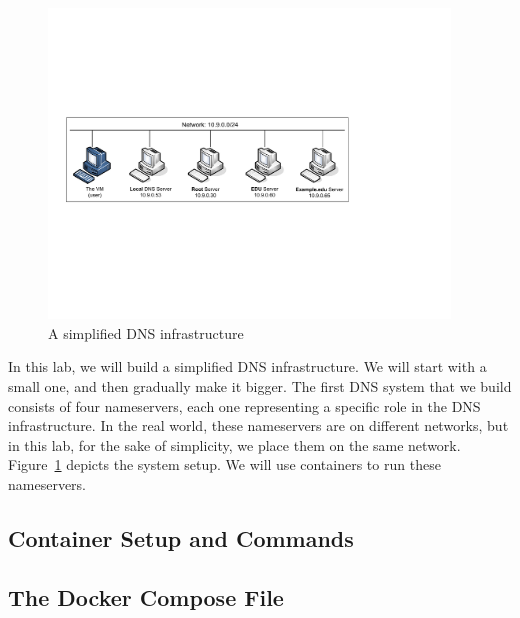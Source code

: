 \begin{figure}[htb]
\begin{center}
\includegraphics[width=0.95\textwidth]{Figs/DNS-in-a-box.pdf}
\end{center}
\caption{A simplified DNS infrastructure}
\label{dns:fig:dns-in-a-box}
\end{figure}


In this lab, we will build a simplified DNS infrastructure. We will
start with a small one, and then gradually make it bigger. 
The first DNS system that we build 
consists of four nameservers, each one representing 
a specific role in the DNS infrastructure. 
In the real world, these nameservers are on different 
networks, but in this lab, for the sake of simplicity, we place them
on the same network. 
Figure~\ref{dns:fig:dns-in-a-box} depicts the system setup. 
We will use containers to run these nameservers. 


\subsection{Container Setup and Commands}





\subsection{The Docker Compose File} 

